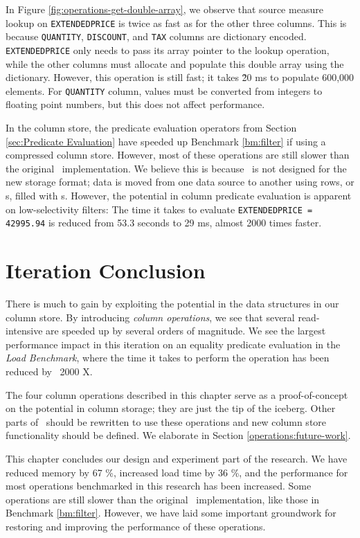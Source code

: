In Figure \ref{fig:operations-get-double-array}, we observe that source measure lookup on \texttt{EXTENDEDPRICE} is twice as fast as for the other three columns. This is because \texttt{QUANTITY}, \texttt{DISCOUNT}, and \texttt{TAX} columns are dictionary encoded. \texttt{EXTENDEDPRICE} only needs to pass its array pointer to the lookup operation, while the other columns must allocate and populate this double array using the dictionary. However, this operation is still fast; it takes \~20 ms to populate 600,000 elements. For \texttt{QUANTITY} column, values must be converted from integers to floating point numbers, but this does not affect performance.

In the column store, the predicate evaluation operators from Section \ref{sec:Predicate Evaluation} have speeded up Benchmark \ref{bm:filter} if using a compressed column store. However, most of these operations are still slower than the original \gap~implementation. We believe this is because \gap~is not designed for the new storage format; data is moved from one data source to another using rows, or s, filled with s. However, the potential in column predicate evaluation is apparent on low-selectivity filters: The time it takes to evaluate \texttt{EXTENDEDPRICE = 42995.94} is reduced from 53.3 seconds to 29 ms, almost 2000 times faster.

\section{Iteration Conclusion}
\label{sec:Chapter Conclusion}
There is much to gain by exploiting the potential in the data structures in our column store. By introducing \textit{column operations}, we see that several read-intensive are speeded up by several orders of magnitude. We see the largest performance impact in this iteration on an equality predicate evaluation in the \textit{Load Benchmark}, where the time it takes to perform the operation has been reduced by ~2000 X.

The four column operations described in this chapter serve as a proof-of-concept on the potential in column storage; they are just the tip of the iceberg. Other parts of \gap~should be rewritten to use these operations and new column store functionality should be defined. We elaborate in Section \ref{operations:future-work}.

This chapter concludes our design and experiment part of the research. We have reduced memory by 67 \%, increased load time by 36 \%, and the performance for most operations benchmarked in this research has been increased. Some operations are still slower than the original \gap~implementation, like those in Benchmark \ref{bm:filter}. However, we have laid some important groundwork for restoring and improving the performance of these operations.

